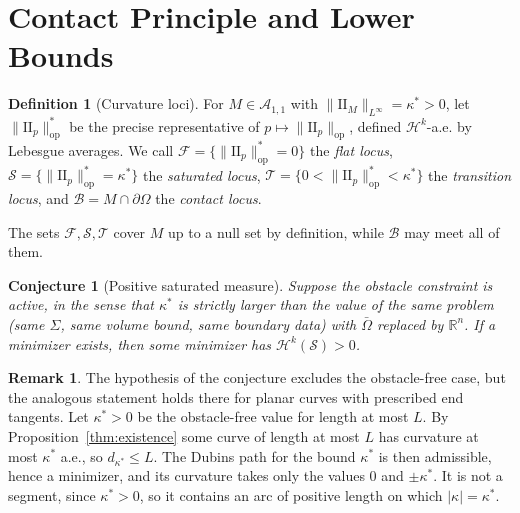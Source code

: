 \documentclass[11pt,reqno]{amsart}
\newtheorem{conjecture}[theorem]{Conjecture}
\theoremstyle{definition}
\newtheorem{definition}[theorem]{Definition}
\newtheorem{remark}[theorem]{Remark}
\providecommand{\R}{\mathbb{R}}
\providecommand{\II}{\mathrm{I\!I}}
\newcommand{\op}{\mathrm{op}}
\providecommand{\Hsn}{\mathcal{H}}
\numberwithin{equation}{section}
\providecommand{\II}{\mathrm{II}}
\providecommand{\R}{\mathbb{R}}
\providecommand{\Hsn}{\mathcal{H}}
\begin{document}
\section{Contact Principle and Lower Bounds}

\begin{definition}[Curvature loci]
\label{def:loci}
For $M \in \mathcal{A}_{1,1}$ with $\|\II_M\|_{L^\infty} = \kappa^* > 0$, let $\|\II_p\|^*_{\op}$ be the precise representative of $p \mapsto \|\II_p\|_{\op}$, defined $\Hsn^k$-a.e. by Lebesgue averages. We call $\mathcal{F} = \{\|\II_p\|^*_{\op} = 0\}$ the \emph{flat locus}, $\mathcal{S} = \{\|\II_p\|^*_{\op} = \kappa^*\}$ the \emph{saturated locus}, $\mathcal{T} = \{0 < \|\II_p\|^*_{\op} < \kappa^*\}$ the \emph{transition locus}, and $\mathcal{B} = M \cap \partial\Omega$ the \emph{contact locus}.
\end{definition}

The sets $\mathcal{F}, \mathcal{S}, \mathcal{T}$ cover $M$ up to a null set by definition, while $\mathcal{B}$ may meet all of them.

\begin{conjecture}[Positive saturated measure]
\label{conj:saturated}
Suppose the obstacle constraint is \emph{active}, in the sense that $\kappa^*$ is strictly larger than the value of the same problem (same $\Sigma$, same volume bound, same boundary data) with $\bar\Omega$ replaced by $\R^n$. If a minimizer exists, then some minimizer has $\Hsn^k(\mathcal{S}) > 0$.
\end{conjecture}

\begin{remark}
The hypothesis of the conjecture excludes the obstacle-free case, but the analogous statement holds there for planar curves with prescribed end tangents. Let $\kappa^* > 0$ be the obstacle-free value for length at most $L$. By Proposition~\ref{thm:existence} some curve of length at most $L$ has curvature at most $\kappa^*$ a.e., so $d_{\kappa^*} \le L$. The Dubins path for the bound $\kappa^*$ is then admissible, hence a minimizer, and its curvature takes only the values $0$ and $\pm\kappa^*$. It is not a segment, since $\kappa^* > 0$, so it contains an arc of positive length on which $|\kappa| = \kappa^*$.
\end{remark}
\end{document}

